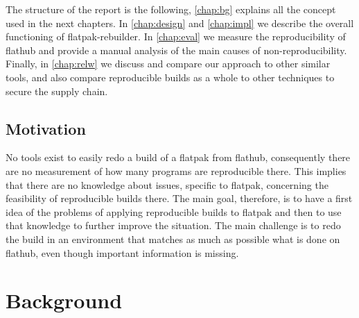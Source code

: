 \documentclass[a4paper,11pt,oneside]{report}
\theoremstyle{definition}
\newcommand{\sysname}{flatpak-rebuilder\xspace}
\newcommand{\rb}{reproducible builds\xspace}
\newcommand{\fp}{flatpak\xspace}
\newcommand{\fh}{flathub\xspace}
\begin{document}
The structure of the report is the following, \autoref{chap:bg} explains all
the concept used in the next chapters. In \autoref{chap:design} and
\autoref{chap:impl} we describe the overall functioning of \sysname. In
\autoref{chap:eval} we measure the reproducibility of \fh and provide a manual
analysis of the main causes of non-reproducibility. Finally, in
\autoref{chap:relw} we discuss and compare our approach to other similar tools,
and also compare \rb as a whole to other techniques to secure the supply chain.

\section{Motivation}
No tools exist to easily redo a build of a \fp from \fh, consequently there are
no measurement of how many programs are reproducible there. This implies that
there are no knowledge about issues, specific to \fp, concerning the
feasibility of \rb there. The main goal, therefore, is to have a first idea of
the problems of applying \rb to \fp and then to use that knowledge to further
improve the situation. The main challenge is to redo the build in an
environment that matches as much as possible what is done on \fh, even though
important information is missing.

\chapter{Background}
\label{chap:bg}
\end{document}
